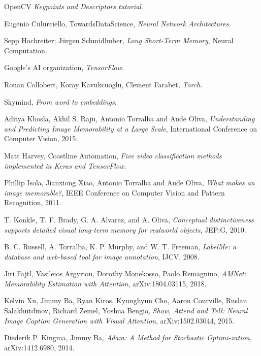 \begin{thebibliography}{}
	OpenCV
	\emph{Keypoints and Descriptors tutorial}.


	Eugenio Culurciello, TowardsDataScience,
	\emph{Neural Network Architectures}.

	Sepp Hochreiter; Jürgen Schmidhuber,
	\emph{Long Short-Term Memory},
	Neural Computation.

	Google’s AI organization,
	\emph{TensorFlow}.


	Ronan Collobert, Koray Kavukcuoglu, Clement Farabet,
    \emph{Torch}.

	Skymind,
    \emph{From word to embeddings}.

	Aditya Khosla, Akhil S. Raju, Antonio Torralba and Aude Oliva,
	\emph{Understanding and Predicting Image Memorability at a Large Scale},
	International Conference on Computer Vision,
	2015.

	Matt Harvey, Coastline Automation,
	\emph{Five video classification methods implemented in Keras and TensorFlow}.

	Phillip Isola, Jianxiong Xiao, Antonio Torralba and Aude Oliva,
	\emph{What makes an image memorable?},
	IEEE Conference on Computer Vision and Pattern Recognition,
	2011.

	T. Konkle, T. F. Brady, G. A. Alvarez, and A. Oliva,
	\emph{Conceptual distinctiveness supports detailed visual long-term memory for realworld objects},
	JEP:G, 2010.

	B. C. Russell, A. Torralba, K. P. Murphy, and W. T. Freeman,
	\emph{LabelMe: a database and web-based tool for image annotation},
	IJCV, 2008.

	Jiri Fajtl, Vasileios Argyriou, Dorothy Monekosso, Paolo Remagnino,
	\emph{AMNet: Memorability Estimation with Attention},
	arXiv:1804.03115, 2018.

	Kelvin Xu, Jimmy Ba, Ryan Kiros, Kyunghyun Cho, Aaron Courville, Ruslan Salakhutdinov, Richard Zemel, Yoshua Bengio,
	\emph{Show, Attend and Tell: Neural Image Caption Generation with Visual Attention},
	arXiv:1502.03044, 2015.

	Diederik P. Kingma, Jimmy Ba,
	\emph{Adam: A Method for Stochastic Optimi-zation},
	arXiv:1412.6980, 2014.

\end{thebibliography}